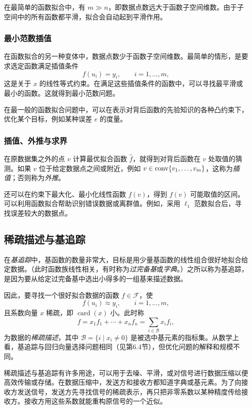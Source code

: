 在最简单的函数拟合中，有 $m\gg n$，即数据点数远大于函数子空间维数。由于子空间中的所有函数都平滑，拟合会自动起到平滑作用。

\subsubsection*{最小范数插值}
在函数拟合的另一种变体中，数据点数少于函数子空间维数。最简单的情形，是要求选定函数满足插值条件
\[f(u_i)=y_i,\qquad i=1,\ldots,m,\]
这是关于 $x$ 的线性等式约束。在满足这些插值条件的函数中，可以寻找最平滑或最小的函数。这就得到最小范数问题。

在最一般的函数拟合问题中，可以在表示对背后函数的先验知识的各种凸约束下，优化某个目标，例如某种误差 $e$ 的度量。

\subsubsection*{插值、外推与求界}
在原数据集之外的点 $v$ 计算最优拟合函数 $\widehat f$，就得到对背后函数在 $v$ 处取值的猜测。如果 $v$ 位于给定数据点之间或附近，例如 $v\in\operatorname{conv}\{v_1,\ldots,v_m\}$，这称为\emph{插值}；否则称为\emph{外推}。

还可以在约束下最大化、最小化线性函数 $f(v)$，得到 $f(v)$ 可能取值的区间。可以利用函数拟合帮助识别错误数据或离群值。例如，采用 $\ell_1$ 范数拟合后，寻找误差较大的数据点。

\subsection{稀疏描述与基追踪}
在\emph{基追踪}中，基函数的数量非常大，目标是用少量基函数的线性组合很好地拟合给定数据。（此时函数族线性相关，有时称为\emph{过完备基}或\emph{字典}。）之所以称为基追踪，是因为要从给定过完备基中选出小得多的一组基来描述数据。

因此，要寻找一个很好拟合数据的函数 $f\in\mathcal F$，使
\[f(u_i)\approx y_i,\qquad i=1,\ldots,m,\]
且系数向量 $x$ 稀疏，即 $\operatorname{card}(x)$ 小。此时称
\[f=x_1f_1+\cdots+x_nf_n=\sum_{i\in\mathcal B}x_if_i,\]
为数据的\emph{稀疏描述}，其中 $\mathcal B=\{i\mid x_i\ne0\}$ 是被选中基元素的指标集。从数学上看，基追踪与回归向量选择问题相同（见第6.4节），但优化问题的解释和规模不同。

稀疏描述与基追踪有许多用途，可以用于去噪、平滑，或对信号进行数据压缩以便高效传输或存储。在数据压缩中，发送方和接收方都知道字典或基元素。为了向接收方发送信号，发送方先寻找信号的稀疏表示，再只把非零系数以某种精度传给接收方。接收方用这些系数就能重构原信号的一个近似。

